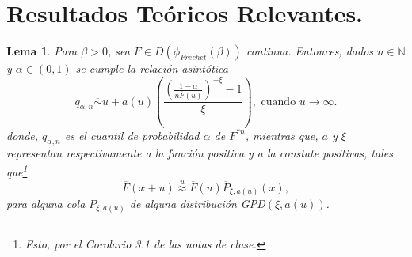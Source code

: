 \documentclass[10.5pt,notitlepage]{article}
\newcommand{\NN}{\mathbb{N}}
\newcommand{\approxu}{\overset{u}{\approx}}
\newcommand{\pare}[1]{\left( #1 \right)}
\theoremstyle{plain}
\newtheorem{lem}[thm]{Lema} %
\begin{document}
\section{Resultados Teóricos Relevantes.}
\begin{lem}\label{lem.1}
Para \(\beta >0\), sea \(F\in D(\phi_{Frechet}(\beta))\) continua. Entonces, dados \(n \in \NN\) y \(\alpha \in (0,1)\) se cumple la relación asintótica
\[
q_{\alpha,n} \overline{\sim} u  + a(u)\pare{\frac{\pare{\frac{1- \alpha}{n\overline{F}(u)}}^{-\xi} - 1}{\xi}}, \text{ cuando } u \to \infty. 
\]
donde, \(q_{\alpha,n}\) es el cuantil de probabilidad \(\alpha\) de \(F^{*n}\), mientras que, \(a\) y \(\xi\) representan respectivamente a la función positiva y a la constate positivas, tales que\footnote{Esto, por el Corolario 3.1 de las notas de clase.} 
\[
\overline{F}(x + u)\approxu \overline{F}(u)\overline{P}_{\xi, a(u)}(x), 
\]
para alguna cola \(\overline{P}_{\xi, a(u)}\) de alguna distribución GPD\((\xi,a(u))\).
\end{lem}
\end{document}
